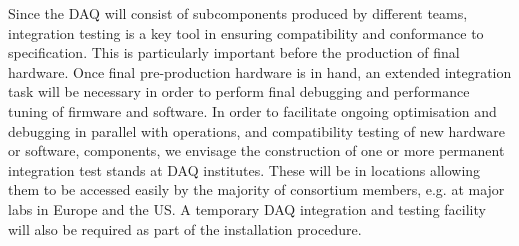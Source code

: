 Since the DAQ will consist of subcomponents produced by different teams, integration testing is a key tool in ensuring compatibility and conformance to specification. This is particularly important before the production of final hardware. Once final pre-production hardware is in hand, an extended integration task will be necessary in order to perform final debugging and performance tuning of firmware and software. In order to facilitate ongoing optimisation and debugging in parallel with operations, and compatibility testing of new hardware or software, components, we envisage the construction of one or more permanent integration test stands at DAQ institutes. These will be in locations allowing them to be accessed easily by the majority of consortium members, e.g. at major labs in Europe and the US. A temporary DAQ integration and testing facility will also be required as part of the installation procedure.


